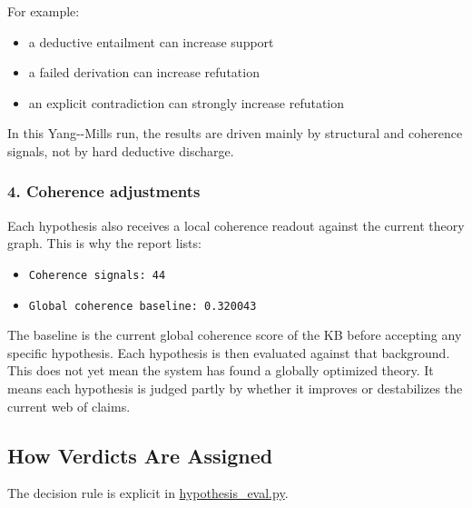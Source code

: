 \documentclass[
]{article}
\providecommand{\tightlist}{%
  \setlength{\itemsep}{0pt}\setlength{\parskip}{0pt}}
\begin{document}
For example:

\begin{itemize}
\tightlist
\item
  a deductive entailment can increase support
\item
  a failed derivation can increase refutation
\item
  an explicit contradiction can strongly increase refutation
\end{itemize}

In this Yang-\/-Mills run, the results are driven mainly by structural
and coherence signals, not by hard deductive discharge.

\subsubsection{4. Coherence adjustments}\label{4-coherence-adjustments}

Each hypothesis also receives a local coherence readout against the
current theory graph. This is why the report lists:

\begin{itemize}
\tightlist
\item
  \texttt{Coherence\ signals:\ 44}
\item
  \texttt{Global\ coherence\ baseline:\ 0.320043}
\end{itemize}

The baseline is the current global coherence score of the KB before
accepting any specific hypothesis. Each hypothesis is then evaluated
against that background. This does not yet mean the system has found a
globally optimized theory. It means each hypothesis is judged partly by
whether it improves or destabilizes the current web of claims.

\subsection{How Verdicts Are Assigned}\label{how-verdicts-are-assigned}

The decision rule is explicit in
\href{/Users/user/files/abducer/abducer/skills/common/hypothesis_eval.py:662}{hypothesis\_eval.py}.
\end{document}
